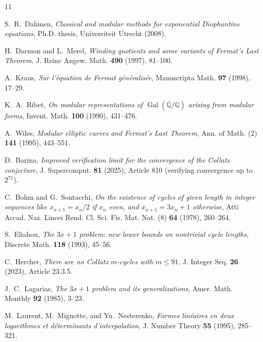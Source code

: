 \documentclass[11pt, a4paper]{amsart}
\theoremstyle{definition}
\begin{document}
\begin{thebibliography}{11}

S.~R.~Dahmen, \emph{Classical and modular methods for exponential Diophantine equations}, Ph.D. thesis, Universiteit Utrecht (2008).

H.~Darmon and L.~Merel, \emph{Winding quotients and some variants of Fermat's Last Theorem}, J. Reine Angew. Math. \textbf{490} (1997), 81--100.

A.~Kraus, \emph{Sur l'\'{e}quation de Fermat g\'{e}n\'{e}ralis\'{e}e}, Manuscripta Math. \textbf{97} (1998), 17--29.

K.~A.~Ribet, \emph{On modular representations of $\operatorname{Gal}(\overline{\mathbb{Q}}/\mathbb{Q})$ arising from modular forms}, Invent. Math. \textbf{100} (1990), 431--476.

A.~Wiles, \emph{Modular elliptic curves and Fermat's Last Theorem}, Ann. of Math. (2) \textbf{141} (1995), 443--551.

D.~Barina, \emph{Improved verification limit for the convergence of the Collatz conjecture}, J. Supercomput. \textbf{81} (2025), Article 810 (verifying convergence up to $2^{71}$).

C.~Bohm and G.~Sontacchi, \emph{On the existence of cycles of given length in integer sequences like $x_{n+1} = x_n/2$ if $x_n$ even, and $x_{n+1} = 3x_n + 1$ otherwise}, Atti Accad. Naz. Lincei Rend. Cl. Sci. Fis. Mat. Nat. (8) \textbf{64} (1978), 260--264.

S.~Eliahou, \emph{The $3x+1$ problem: new lower bounds on nontrivial cycle lengths}, Discrete Math. \textbf{118} (1993), 45--56.

C.~Hercher, \emph{There are no Collatz $m$-cycles with $m \le 91$}, J. Integer Seq. \textbf{26} (2023), Article 23.3.5.

J.~C.~Lagarias, \emph{The $3x+1$ problem and its generalizations}, Amer. Math. Monthly \textbf{92} (1985), 3--23.

M.~Laurent, M.~Mignotte, and Yu.~Nesterenko, \emph{Formes lin\'{e}aires en deux logarithmes et d\'{e}terminants d'interpolation}, J. Number Theory \textbf{55} (1995), 285--321.


\end{thebibliography}
\end{document}
